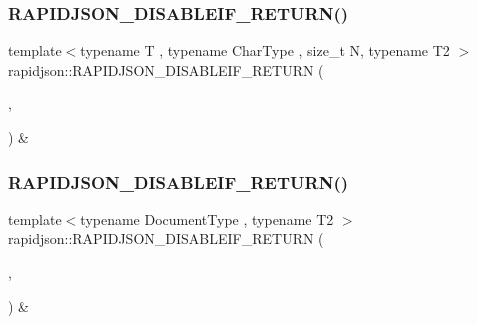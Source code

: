 \mbox{\label{namespacerapidjson_ac23c133f2ee48521a2754090454de12b}} 
\subsubsection{\texorpdfstring{RAPIDJSON\_DISABLEIF\_RETURN()}{RAPIDJSON\_DISABLEIF\_RETURN()}\hspace{0.1cm}{\footnotesize\ttfamily [2/4]}}
{\footnotesize\ttfamily template$<$typename T , typename Char\+Type , size\+\_\+t N, typename T2 $>$ \\
rapidjson\+::\+R\+A\+P\+I\+D\+J\+S\+O\+N\+\_\+\+D\+I\+S\+A\+B\+L\+E\+I\+F\+\_\+\+R\+E\+T\+U\+RN (\begin{DoxyParamCaption}\item[{(internal\+::\+Or\+Expr$<$ internal\+::\+Is\+Pointer$<$ T2 $>$, \mbox{\hyperlink{structrapidjson_1_1internal_1_1_is_generic_value}{internal\+::\+Is\+Generic\+Value}}$<$ T2 $>$ $>$)}]{,  }\item[{(typename T\+::\+Value\+Type \&)}]{ }\end{DoxyParamCaption}) \&}

\mbox{\label{namespacerapidjson_adcea79de1892e918329700f98dfd6ce2}} 
\subsubsection{\texorpdfstring{RAPIDJSON\_DISABLEIF\_RETURN()}{RAPIDJSON\_DISABLEIF\_RETURN()}\hspace{0.1cm}{\footnotesize\ttfamily [3/4]}}
{\footnotesize\ttfamily template$<$typename Document\+Type , typename T2 $>$ \\
rapidjson\+::\+R\+A\+P\+I\+D\+J\+S\+O\+N\+\_\+\+D\+I\+S\+A\+B\+L\+E\+I\+F\+\_\+\+R\+E\+T\+U\+RN (\begin{DoxyParamCaption}\item[{(internal\+::\+Or\+Expr$<$ internal\+::\+Is\+Pointer$<$ T2 $>$, \mbox{\hyperlink{structrapidjson_1_1internal_1_1_is_generic_value}{internal\+::\+Is\+Generic\+Value}}$<$ T2 $>$ $>$)}]{,  }\item[{(typename Document\+Type\+::\+Value\+Type \&)}]{ }\end{DoxyParamCaption}) \&}

